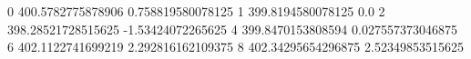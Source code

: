 0 400.5782775878906 0.758819580078125
1 399.8194580078125 0.0
2 398.28521728515625 -1.53424072265625
4 399.8470153808594 0.027557373046875
6 402.1122741699219 2.292816162109375
8 402.34295654296875 2.52349853515625
